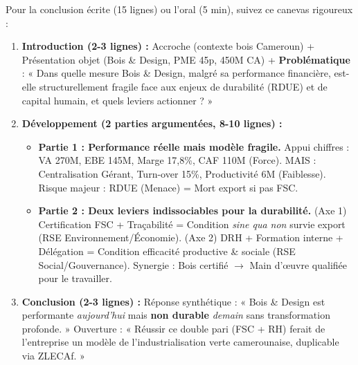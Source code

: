 \documentclass[11pt]{article}
\begin{document}
\begin{methode}
Pour la conclusion écrite (15 lignes) ou l'oral (5 min), suivez ce canevas rigoureux :
\begin{enumerate}
    \item \textbf{Introduction (2-3 lignes) :} Accroche (contexte bois Cameroun) + Présentation objet (Bois \& Design, PME 45p, 450M CA) + \textbf{Problématique} : « Dans quelle mesure Bois \& Design, malgré sa performance financière, est-elle structurellement fragile face aux enjeux de durabilité (RDUE) et de capital humain, et quels leviers actionner ? »
    \item \textbf{Développement (2 parties argumentées, 8-10 lignes) :}
        \begin{itemize}
            \item \textbf{Partie 1 : Performance réelle mais modèle fragile.} Appui chiffres : VA 270M, EBE 145M, Marge 17,8\%, CAF 110M (Force). MAIS : Centralisation Gérant, Turn-over 15\%, Productivité 6M (Faiblesse). Risque majeur : RDUE (Menace) = Mort export si pas FSC.
            \item \textbf{Partie 2 : Deux leviers indissociables pour la durabilité.} (Axe 1) Certification FSC + Traçabilité = Condition \textit{sine qua non} survie export (RSE Environnement/Économie). (Axe 2) DRH + Formation interne + Délégation = Condition efficacité productive \& sociale (RSE Social/Gouvernance). Synergie : Bois certifié $\rightarrow$ Main d'œuvre qualifiée pour le travailler.
        \end{itemize}
    \item \textbf{Conclusion (2-3 lignes) :} Réponse synthétique : « Bois \& Design est performante \textit{aujourd'hui} mais \textbf{non durable} \textit{demain} sans transformation profonde. » Ouverture : « Réussir ce double pari (FSC + RH) ferait de l'entreprise un modèle de l'industrialisation verte camerounaise, duplicable via ZLECAf. »
\end{enumerate}
\end{methode}
\end{document}
